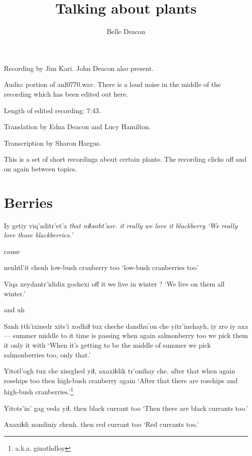 \documentclass[12pt]{article}
\begin{document}
\title{Talking about plants}
\author{Belle Deacon}
\date{}
\maketitle

Recording by Jim Kari.  John Deacon also present.

Audio:  portion of anl0770.wav. There is a loud noise in the middle of the recording which has been edited out here.

Length of edited recording:  7:43.

Translation by Edna Deacon and Lucy Hamilton.

Transcription by Sharon Hargus.

\bigskip
This is a set of short recordings about certain plants.  The recording
clicks off and on again between topics.

\section{Berries}

\gll Iy getiy viq'aditr'et'a \em{that} niɬanht'asr.
it really {we love it} {} blackberry
\glt `We really love those blackberries.'
\glend

cause

\gll nenhtl'it chenh
{low-bush cranberry} too
\glt `low-bush cranberries too'
\glend

\gll Viqa xeydantr'ididix     gochexi
{off it} {we live in winter} ?
\glt `We live on them all winter.'
\glend

and uh

\gll Sanh tth'ixinedr xits'i xodhiɬ tux cheche dandhu'on che yitr'inehayh, iy zro iy axa--- 
summer middle  {to it} {time is passing} when again salmonberry too {we pick them} it only it {with}
\glt `When it's getting to be the middle of summer we pick salmonberries too, only that.'
\glend

\gll Yitotl'ogh tux che xisrghed yiɬ, axaxiɬdik tr'onihay che.
{after that} when again rosehips too then {high-bush cranberry} again
\glt `After that there are rosehips and high-bush cranberries.'\footnote{a.k.a. ginathdloy}
\glend

\gll Yitots'in' {gag veda} yiɬ.
then       {black currant} too
\glt `Then there are black currants too.'
\glend

\gll Axaxiɬdi nondiniy chenh.
then     {red currant} too
\glt `Red currants too.'
\glend
\end{document}
